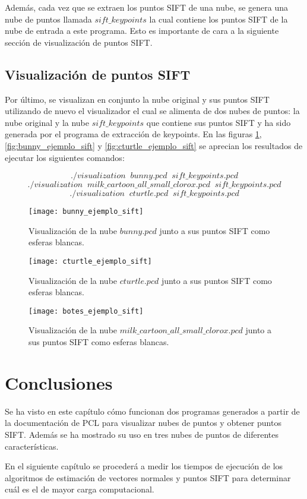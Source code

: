 Además, cada vez que se extraen los puntos SIFT de una nube, se genera una nube de puntos llamada $sift\_keypoints$ la cual contiene los puntos SIFT de la nube de entrada a este programa. Esto es importante de cara a la siguiente sección de visualización de puntos SIFT.


\subsection{Visualización de puntos SIFT}
Por último, se visualizan en conjunto la nube original y sus puntos SIFT utilizando de nuevo el visualizador el cual se alimenta de dos nubes de puntos: la nube original y la nube $sift\_keypoints$ que contiene sus puntos SIFT y ha sido generada por el programa de extracción de keypoints. En las figuras \ref{fig:botes_ejemplo_sift}, \ref{fig:bunny_ejemplo_sift} y \ref{fig:cturtle_ejemplo_sift} se aprecian los resultados de ejecutar los siguientes comandos:

$$./visualization\;\;bunny.pcd\;\;sift\_keypoints.pcd$$
$$./visualization\;\;milk\_cartoon\_all\_small\_clorox.pcd\;\;sift\_keypoints.pcd$$
$$./visualization\;\;cturtle.pcd\;\;sift\_keypoints.pcd$$


\begin{figure}[!htb]
  \texttt{[image: bunny\_ejemplo\_sift]}
  \caption{Visualización de la nube $bunny.pcd$ junto a sus puntos SIFT como esferas blancas.}\label{fig:bunny_ejemplo_sift}
\endminipage\hfill
{}
  \texttt{[image: cturtle\_ejemplo\_sift]}
  \caption{Visualización de la nube $cturtle.pcd$ junto a sus puntos SIFT como esferas blancas.}\label{fig:cturtle_ejemplo_sift}
\endminipage\hfill
{}
  \texttt{[image: botes\_ejemplo\_sift]}
  \caption{Visualización de la nube $milk\_cartoon\_all\_small\_clorox.pcd$ junto a sus puntos SIFT como esferas blancas.}\label{fig:botes_ejemplo_sift}
\endminipage\hfill
\end{figure}


\section{Conclusiones}
Se ha visto en este capítulo cómo funcionan dos programas generados a partir de la documentación de PCL para visualizar nubes de puntos y obtener puntos SIFT. Además se ha mostrado su uso en tres nubes de puntos de diferentes características.

En el siguiente capítulo se procederá a medir los tiempos de ejecución de los algoritmos de estimación de vectores normales y puntos SIFT para determinar cuál es el de mayor carga computacional.
